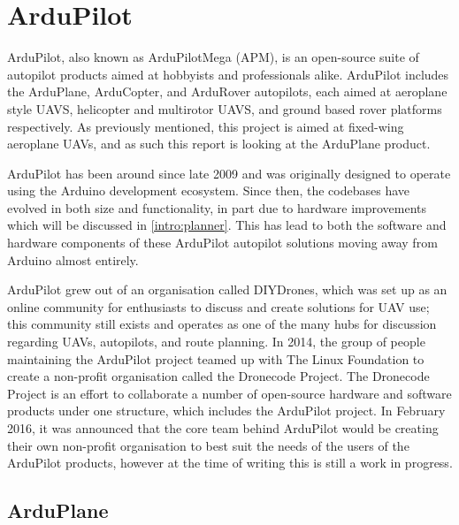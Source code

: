 
\section{ArduPilot} 
\label{intro:ardupilot}

ArduPilot, also known as ArduPilotMega (APM), is an open-source suite of autopilot products aimed at hobbyists and professionals alike. ArduPilot includes the ArduPlane, ArduCopter, and ArduRover autopilots, each aimed at aeroplane style UAVS, helicopter and multirotor UAVS, and ground based rover platforms respectively. As previously mentioned, this project is aimed at fixed-wing aeroplane UAVs, and as such this report is looking at the ArduPlane product. 

ArduPilot has been around since late 2009 and was originally designed to operate using the Arduino development ecosystem. Since then, the codebases have evolved in both size and functionality, in part due to hardware improvements which will be discussed in \ref{intro:planner}. This has lead to both the software and hardware components of these ArduPilot autopilot solutions moving away from Arduino almost entirely.

ArduPilot grew out of an organisation called DIYDrones, %
which was set up as an online community for enthusiasts to discuss and create solutions for UAV use; this community still exists and operates as one of the many hubs for discussion regarding UAVs, autopilots, and route planning. In 2014, the group of people maintaining the ArduPilot project teamed up with The Linux Foundation to create a non-profit organisation called the Dronecode Project. The Dronecode Project is an effort to collaborate a number of open-source hardware and software products under one structure, which includes the ArduPilot project. In February 2016, it was announced that the core team behind ArduPilot would be creating their own non-profit organisation to best suit the needs of the users of the ArduPilot products, however at the time of writing this is still a work in progress. %

\subsection{ArduPlane}
\label{intro:arduplane}


